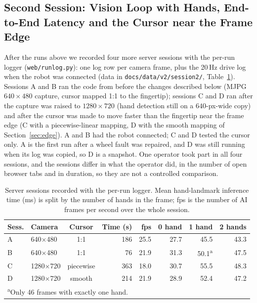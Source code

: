 \documentclass[5p,twocolumn]{elsarticle}
\begin{document}
\subsection{Second Session: Vision Loop with Hands, End-to-End Latency and the Cursor near the Frame Edge}\label{sec:sess2}
After the runs above we recorded four more server sessions with the per-run logger (\texttt{web/runlog.py}): one log row per camera frame, plus the 20\,Hz drive log when the robot was connected (data in \texttt{docs/data/v2/session2/}, Table~\ref{tab:sess2}). Sessions A and B ran the code from before the changes described below (MJPG $640\times480$ capture, cursor mapped 1:1 to the fingertip); sessions C and D ran after the capture was raised to $1280\times720$ (hand detection still on a $640$-px-wide copy) and after the cursor was made to move faster than the fingertip near the frame edge (C with a piecewise-linear mapping, D with the smooth mapping of Section~\ref{sec:edge}). A and B had the robot connected; C and D tested the cursor only. A is the first run after a wheel fault was repaired, and D was still running when its log was copied, so D is a snapshot. One operator took part in all four sessions, and the sessions differ in what the operator did, in the number of open browser tabs and in duration, so they are not a controlled comparison.

\begin{table}[!t]
\caption{Server sessions recorded with the per-run logger. Mean hand-landmark inference time (ms) is split by the number of hands in the frame; fps is the number of AI frames per second over the whole session.}
\label{tab:sess2}
\centering
\footnotesize
\setlength{\tabcolsep}{2pt}
\begin{tabular}{llcrrrrr}
\toprule
Sess. & Camera & Cursor & Time (s) & fps & 0 hand & 1 hand & 2 hands \\
\midrule
A & 640$\times$480 & 1:1 & 186 & 25.5 & 27.7 & 45.5 & 43.3 \\
B & 640$\times$480 & 1:1 & 76 & 21.9 & 31.3 & 50.1\textsuperscript{a} & 47.5 \\
C & 1280$\times$720 & piecewise & 363 & 18.0 & 30.7 & 55.5 & 48.3 \\
D & 1280$\times$720 & smooth & 214 & 21.9 & 28.9 & 52.4 & 47.2 \\
\bottomrule
\multicolumn{8}{l}{\footnotesize\textsuperscript{a}Only 46 frames with exactly one hand.}\\
\end{tabular}
\end{table}
\end{document}
